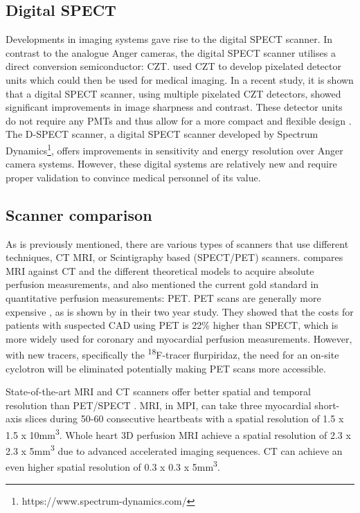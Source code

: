 \subsection*{Digital SPECT}
Developments in imaging systems gave rise to the digital \ac{SPECT} scanner. In contrast to the analogue Anger cameras, the digital \ac{SPECT} scanner utilises a direct conversion semiconductor: \ac{CZT}. \cite{wagenaar2004cdte} used \ac{CZT} to develop pixelated detector units which could then be used for medical imaging. In a recent study, it is shown that a digital \ac{SPECT} scanner, using multiple pixelated \ac{CZT} detectors, showed significant improvements in image sharpness and contrast\citep{goshen2018feasibility}. These detector units do not require any \acp{PMT} and thus allow for a more compact and flexible design \citep{erlandsson2009performance}. The D-SPECT scanner, a digital \ac{SPECT} scanner developed by Spectrum Dynamics\footnote{https://www.spectrum-dynamics.com/}, offers improvements in sensitivity and energy resolution \citep{SpectDynam2018} over Anger camera systems. However, these digital systems are relatively new and require proper validation to convince medical personnel of its value.

\subsection{Scanner comparison}
As is previously mentioned, there are various types of scanners that use different techniques, \ac{CT} \ac{MRI}, or Scintigraphy based (\ac{SPECT}/\ac{PET}) scanners. \cite{pelgrim2016quantitative} compares \ac{MRI} against \ac{CT} and the different theoretical models to acquire absolute perfusion measurements, and also mentioned the current gold standard in quantitative perfusion measurements: \ac{PET}. \ac{PET} scans are generally more expensive \citep{RadioPead2018}, as is shown by \cite{hlatky2014economic} in their two year study. They showed that the costs for patients with suspected \ac{CAD} using \ac{PET} is 22\% higher than \ac{SPECT}, which is more widely used for coronary and myocardial perfusion measurements\citep{rahmim2008pet}. However, with new tracers, specifically the \textsuperscript{18}F-tracer flurpiridaz,  the need for an on-site cyclotron will be eliminated\citep{pelgrim2016quantitative} potentially making \ac{PET} scans more accessible.

State-of-the-art \ac{MRI} and \ac{CT} scanners offer better spatial and temporal resolution than \ac{PET}/\ac{SPECT} \citep{pelgrim2016quantitative, khalil2011molecular}. \ac{MRI}, in \acl{MPI}, can take three myocardial short-axis slices during 50-60 consecutive heartbeats with a spatial resolution of 1.5 x 1.5 x 10mm\textsuperscript{3}. Whole heart 3D perfusion MRI achieve a spatial resolution of 2.3 x 2.3 x 5mm\textsuperscript{3} due to advanced accelerated imaging sequences. \ac{CT} can achieve an even higher spatial resolution of 0.3 x 0.3 x 5mm\textsuperscript{3}.

